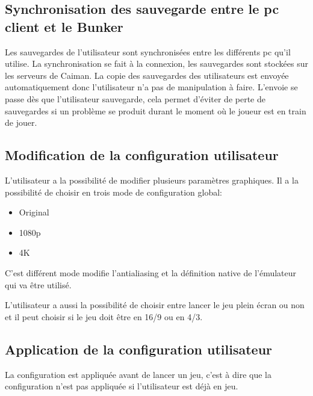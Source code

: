 \documentclass[a4paper,12pt,french]{sphinxmanual}
\begin{document}
\sphinxAtStartPar
{}


\subsection{Synchronisation des sauvegarde entre le pc client et le Bunker}
\label{\detokenize{fonctionnelle:synchronisation-des-sauvegarde-entre-le-pc-client-et-le-bunker}}
\sphinxAtStartPar
Les sauvegardes de l’utilisateur sont synchronisées entre les différents pc qu’il utilise. La synchronisation se fait à la connexion, les sauvegardes sont stockées sur les serveurs de Caiman. La copie des sauvegardes des utilisateurs est envoyée automatiquement donc l’utilisateur n’a pas de manipulation à faire. L’envoie se passe dès que l’utilisateur sauvegarde, cela permet d’éviter de perte de sauvegardes si un problème se produit durant le moment où le joueur est en train de jouer.


\subsection{Modification de la configuration utilisateur}
\label{\detokenize{fonctionnelle:modification-de-la-configuration-utilisateur}}
\sphinxAtStartPar
L’utilisateur a la possibilité de modifier plusieurs paramètres graphiques. Il a la possibilité de choisir en trois mode de configuration global:
\begin{itemize}
\item {} 
\sphinxAtStartPar
Original

\item {} 
\sphinxAtStartPar
1080p

\item {} 
\sphinxAtStartPar
4K

\end{itemize}

\sphinxAtStartPar
C’est différent mode modifie l’antialiasing et la définition native de l’émulateur qui va être utilisé.

\sphinxAtStartPar
L’utilisateur a aussi la possibilité de choisir entre lancer le jeu plein écran ou non et il peut choisir si le jeu doit être en 16/9 ou en 4/3.

\sphinxAtStartPar
{}


\subsection{Application de la configuration utilisateur}
\label{\detokenize{fonctionnelle:application-de-la-configuration-utilisateur}}
\sphinxAtStartPar
La configuration est appliquée avant de lancer un jeu, c’est à dire que la configuration n’est pas appliquée si l’utilisateur est déjà en jeu.
\end{document}
